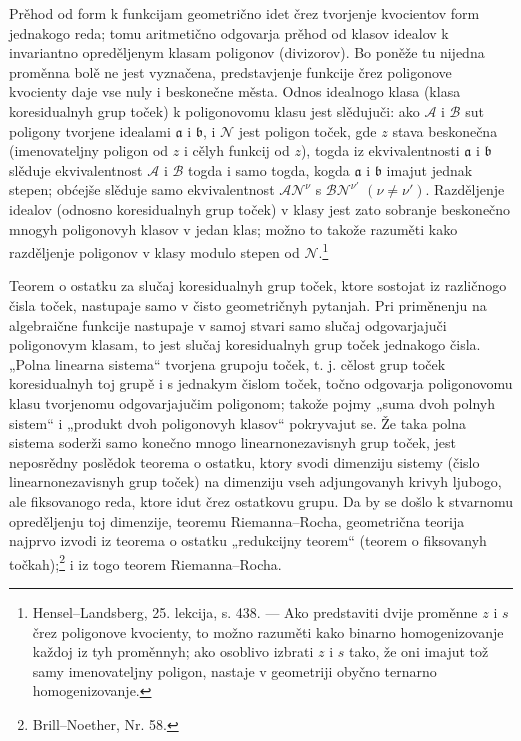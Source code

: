 \documentclass[11pt]{article}
\providecommand{\fra}{\mathfrak a}
\providecommand{\frb}{\mathfrak b}
\providecommand{\calA}{\mathcal A}
\providecommand{\calB}{\mathcal B}
\providecommand{\calN}{\mathcal N}
\begin{document}
Prěhod od form k funkcijam geometrično idet črez tvorjenje kvocientov form jednakogo reda; tomu aritmetično odgovarja prěhod od klasov idealov k invariantno opreděljenym klasam poligonov (divizorov). Bo poněže tu nijedna proměnna bolě ne jest vyznačena, predstavjenje funkcije črez poligonove kvocienty daje vse nuly i beskonečne města. Odnos idealnogo klasa (klasa koresidualnyh grup toček) k poligonovomu klasu jest slědujuči: ako \(\calA\) i \(\calB\) sut poligony tvorjene idealami \(\fra\) i \(\frb\), i \(\calN\) jest poligon toček, gde \(z\) stava beskonečna (imenovateljny poligon od \(z\) i cělyh funkcij od \(z\)), togda iz ekvivalentnosti \(\fra\) i \(\frb\) slěduje ekvivalentnost \(\calA\) i \(\calB\) togda i samo togda, kogda \(\fra\) i \(\frb\) imajut jednak stepen; obćejše slěduje samo ekvivalentnost \(\calA\calN^\nu\) s \(\calB\calN^{\nu'}\) \((\nu\ne\nu')\). Razděljenje idealov (odnosno koresidualnyh grup toček) v klasy jest zato sobranje beskonečno mnogyh poligonovyh klasov v jedan klas; možno to takože razuměti kako razděljenje poligonov v klasy modulo stepen od \(\calN\).\footnote{Hensel--Landsberg, 25. lekcija, s. 438. --- Ako predstaviti dvije proměnne \(z\) i \(s\) črez poligonove kvocienty, to možno razuměti kako binarno homogenizovanje každoj iz tyh proměnnyh; ako osoblivo izbrati \(z\) i \(s\) tako, že oni imajut tož samy imenovateljny poligon, nastaje v geometriji obyčno ternarno homogenizovanje.}

Teorem o ostatku za slučaj koresidualnyh grup toček, ktore sostojat iz različnogo čisla toček, nastupaje samo v čisto geometričnyh pytanjah. Pri priměnenju na algebraične funkcije nastupaje v samoj stvari samo slučaj odgovarjajuči poligonovym klasam, to jest slučaj koresidualnyh grup toček jednakogo čisla. „Polna linearna sistema“ tvorjena grupoju toček, t. j. cělost grup toček koresidualnyh toj grupě i s jednakym čislom toček, točno odgovarja poligonovomu klasu tvorjenomu odgovarjajučim poligonom; takože pojmy „suma dvoh polnyh sistem“ i „produkt dvoh poligonovyh klasov“ pokryvajut se. Že taka polna sistema soderži samo konečno mnogo linearnonezavisnyh grup toček, jest neposrědny poslědok teorema o ostatku, ktory svodi dimenziju sistemy (čislo linearnonezavisnyh grup toček) na dimenziju vseh adjungovanyh krivyh ljubogo, ale fiksovanogo reda, ktore idut črez ostatkovu grupu. Da by se došlo k stvarnomu opreděljenju toj dimenzije, teoremu Riemanna--Rocha, geometrična teorija najprvo izvodi iz teorema o ostatku „redukcijny teorem“ (teorem o fiksovanyh točkah);\footnote{Brill--Noether, Nr. 58.} i iz togo teorem Riemanna--Rocha.
\end{document}
